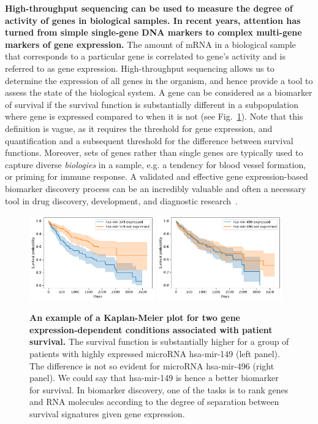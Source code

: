 \documentclass[11pt,a4paper]{article}
\renewcommand{\bold}{\textbf}
\begin{document}
\bold{High-throughput sequencing can be used to measure the degree of activity of genes in biological samples. In recent years, attention has turned from simple single-gene DNA markers to complex multi-gene markers of gene expression.} The amount of mRNA in a biological sample that corresponds to a particular gene is correlated to gene's activity and is referred to as gene expression. High-throughput sequencing allows us to determine the expression of all genes in the organism, and hence provide a tool to assess the state of the biological system. A gene can be considered as a biomarker of survival if the survival function is substantially different in a subpopulation where gene is expressed compared to when it is not (see Fig.~\ref{fig:km-marker}). Note that this definition is vague, as it requires the threshold for gene expression, and quantification and a subsequent threshold for the difference between survival functions. Moreover, sets of genes rather than single genes are typically used to capture diverse {\em biologies} in a sample, e.g. a tendency for blood vessel formation, or priming for immune response. A validated and effective gene expression-based biomarker discovery process can be an incredibly valuable and often a necessary tool in drug discovery, development, and diagnostic research~\cite{MonforteMcPhail2005}.

\begin{figure}
\includegraphics[width=0.48\textwidth]{hsa-mir-149}\hfill
\includegraphics[width=0.48\textwidth]{hsa-mir-496}
\caption{\bold{An example of a Kaplan-Meier plot for two gene expression-dependent conditions associated with patient survival.} The survival function is substantially higher for a group of patients with highly expressed microRNA hsa-mir-149 (left panel). The difference is not so evident for microRNA hsa-mir-496 (right panel). We could say that hsa-mir-149 is hence a better biomarker for survival. In biomarker discovery, one of the tasks is to rank genes and RNA molecules according to the degree of separation between survival signatures given gene expression.}
\label{fig:km-marker}
\end{figure}
\end{document}
